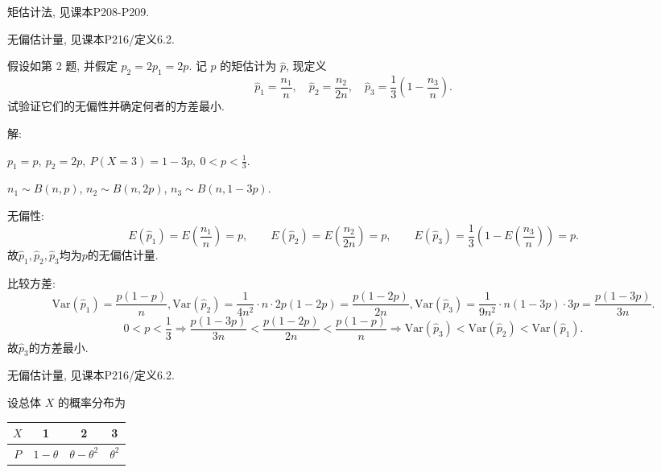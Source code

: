 \documentclass[standard]{ExBook}
\renewenvironment{shaded}{%
  \def\FrameCommand{\fboxsep=\FrameSep \colorbox{shadecolor}}%
  \MakeFramed{\advance\hsize-\width \FrameRestore}%
}{%
  \endMakeFramed
}
\begin{document}
\begin{qitems}
\textcolor{themeColor}{\selectfont {} 矩估计法, 见课本P208-P209.}

\textcolor{themeColor}{\selectfont {} 无偏估计量, 见课本P216/定义6.2.}

\vspace{2.5cm-5em}

    \begin{bbox}
    \begin{shaded}
        \qitem
假设如第 2 题, 并假定 \( p_2 = 2p_1 = 2p \). 记 \( p \) 的矩估计为 \( \hat{p} \), 现定义
\[\hat{p}_1 = \frac{n_1}{n}, \quad \hat{p}_2 = \frac{n_2}{2n}, \quad \hat{p}_3 = \frac{1}{3} \left( 1 - \frac{n_3}{n} \right).\]
试验证它们的无偏性并确定何者的方差最小.
    \end{shaded}
    \end{bbox}

\vspace{\dimexpr2.5cm-5em\relax}

解: 

$p_1=p,\ p_2=2p,\ P(X=3)=1-3p,\ 0<p<\frac{1}{3}$.

$n_1\sim B(n,p)$, $n_2\sim B(n,2p)$, $n_3\sim B(n,1-3p)$.

无偏性:
$$
E(\hat{p}_1)=E\left(\frac{n_1}{n}\right)=p,
\qquad
E(\hat{p}_2)=E\left(\frac{n_2}{2n}\right)=p,
\qquad
E(\hat{p}_3)=\frac{1}{3}\left(1-E\left(\frac{n_3}{n}\right)\right)=p.
$$
故$\hat{p}_1,\hat{p}_2,\hat{p}_3$均为$p$的无偏估计量.

比较方差:
$$
\mathrm{Var}(\hat{p}_1)=\frac{p(1-p)}{n}, 
\mathrm{Var}(\hat{p}_2)=\frac{1}{4n^2}\cdot n\cdot 2p(1-2p)=\frac{p(1-2p)}{2n}, 
\mathrm{Var}(\hat{p}_3)=\frac{1}{9n^2}\cdot n(1-3p)\cdot 3p=\frac{p(1-3p)}{3n}.
$$
$$
0<p<\frac{1}{3}
\Longrightarrow
\frac{p(1-3p)}{3n}<\frac{p(1-2p)}{2n}<\frac{p(1-p)}{n}
\Longrightarrow
\mathrm{Var}(\hat{p}_3)<\mathrm{Var}(\hat{p}_2)<\mathrm{Var}(\hat{p}_1).
$$
故$\hat{p}_3$的方差最小.

\textcolor{themeColor}{\selectfont {} 无偏估计量, 见课本P216/定义6.2.}

\vspace{2.5cm-5em}

    \begin{bbox}
    \begin{shaded}
        \qitem
设总体 \( X \) 的概率分布为

\begin{center}
\setlength{\tabcolsep}{50pt}
\begin{tabular}{c|ccc}
\hline
\( X \) & 1 & 2 & 3 \\
\hline
\( P \) & \( 1 - \theta \) & \( \theta - \theta^2 \) & \( \theta^2 \) \\
\hline
\end{tabular}
\end{center}


\end{shaded}
\end{bbox}
\end{qitems}
\end{document}
